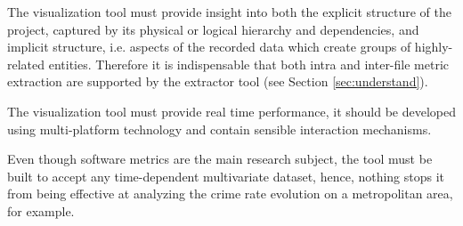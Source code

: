 The visualization tool must provide insight into both the explicit structure of the project, captured by its physical or logical hierarchy and dependencies, and implicit structure, i.e. aspects of the recorded data which create groups of highly-related entities. Therefore it is indispensable that both intra and inter-file metric extraction are supported by the extractor tool (see Section \ref{sec:understand}).

The visualization tool must provide real time performance, it should be developed using multi-platform technology and contain sensible interaction mechanisms.

Even though software metrics are the main research subject, the tool must be built to accept any time-dependent multivariate dataset, hence, nothing stops it from being effective at analyzing the crime rate evolution on a metropolitan area, for example.
